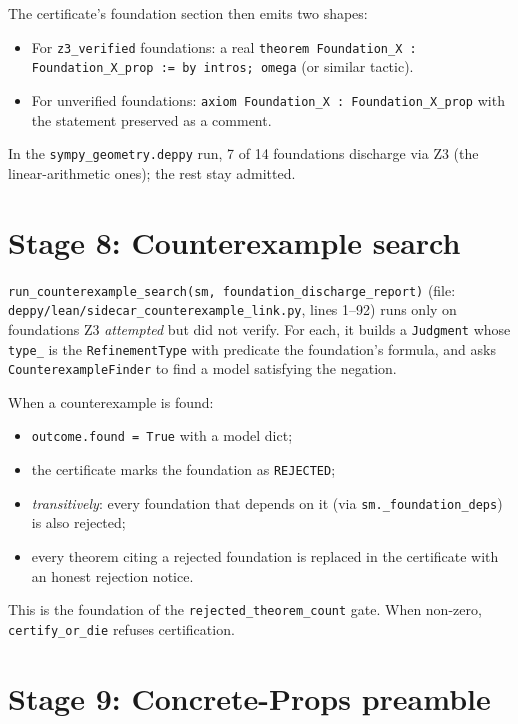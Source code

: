 The certificate's foundation section then emits two shapes:

\begin{itemize}[leftmargin=1.7em]
  \item For \texttt{z3\_verified} foundations: a real
    \texttt{theorem Foundation\_X : Foundation\_X\_prop := by
    intros; omega} (or similar tactic).
  \item For unverified foundations: \texttt{axiom Foundation\_X :
    Foundation\_X\_prop} with the statement preserved as a comment.
\end{itemize}

In the \texttt{sympy\_geometry.deppy} run, 7 of 14 foundations
discharge via Z3 (the linear-arithmetic ones); the rest stay
admitted.

\section{Stage 8: Counterexample search}
\label{sec:counter-search}

\texttt{run\_counterexample\_search(sm,
foundation\_discharge\_report)} (file:
\texttt{deppy/lean/sidecar\_counterexample\_link.py}, lines 1--92)
runs only on foundations Z3 \emph{attempted} but did not verify.
For each, it builds a \texttt{Judgment} whose \texttt{type\_} is
the \texttt{RefinementType} with predicate the foundation's
formula, and asks \texttt{CounterexampleFinder} to find a model
satisfying the negation.

When a counterexample is found:
\begin{itemize}[leftmargin=1.7em]
  \item \texttt{outcome.found = True} with a model dict;
  \item the certificate marks the foundation as
    \texttt{REJECTED};
  \item \emph{transitively}: every foundation that depends on it (via
    \texttt{sm.\_foundation\_deps}) is also rejected;
  \item every theorem citing a rejected foundation is replaced in
    the certificate with an honest rejection notice.
\end{itemize}

This is the foundation of the \texttt{rejected\_theorem\_count}
gate.  When non-zero, \texttt{certify\_or\_die} refuses
certification.

\section{Stage 9: Concrete-Props preamble}
\label{sec:concrete-props}


